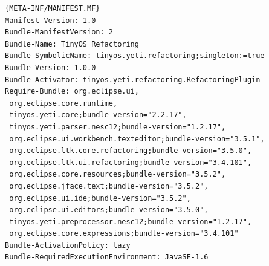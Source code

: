 \documentclass[a4paper,10pt]{report}
\begin{document}
\begin{lstlisting}[caption=MANIFEST]{META-INF/MANIFEST.MF}
Manifest-Version: 1.0
Bundle-ManifestVersion: 2
Bundle-Name: TinyOS_Refactoring
Bundle-SymbolicName: tinyos.yeti.refactoring;singleton:=true
Bundle-Version: 1.0.0
Bundle-Activator: tinyos.yeti.refactoring.RefactoringPlugin
Require-Bundle: org.eclipse.ui,
 org.eclipse.core.runtime,
 tinyos.yeti.core;bundle-version="2.2.17",
 tinyos.yeti.parser.nesc12;bundle-version="1.2.17",
 org.eclipse.ui.workbench.texteditor;bundle-version="3.5.1",
 org.eclipse.ltk.core.refactoring;bundle-version="3.5.0",
 org.eclipse.ltk.ui.refactoring;bundle-version="3.4.101",
 org.eclipse.core.resources;bundle-version="3.5.2",
 org.eclipse.jface.text;bundle-version="3.5.2",
 org.eclipse.ui.ide;bundle-version="3.5.2",
 org.eclipse.ui.editors;bundle-version="3.5.0",
 tinyos.yeti.preprocessor.nesc12;bundle-version="1.2.17",
 org.eclipse.core.expressions;bundle-version="3.4.101"
Bundle-ActivationPolicy: lazy
Bundle-RequiredExecutionEnvironment: JavaSE-1.6
\end{lstlisting}
\end{document}
